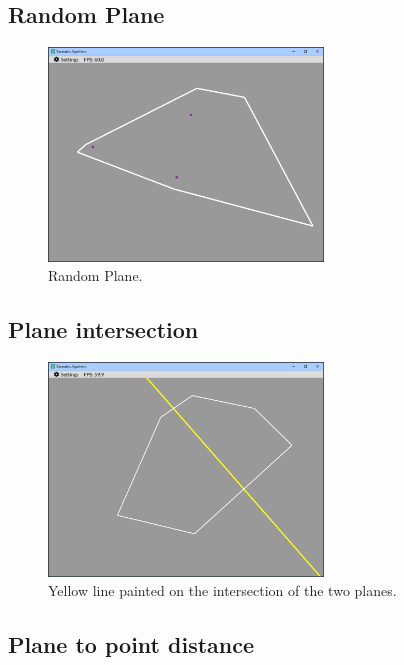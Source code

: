 \documentclass[12pt,a4paper,english]{article}
\begin{document}
\subsection{Random Plane}

\begin{figure}[H]
    \centering
    \includegraphics[width=0.65\textwidth]{p2b-1}
    \caption[]{Random Plane.}
    \label{fig:p2b-1}
\end{figure}

\subsection{Plane intersection}

\begin{figure}[H]
    \centering
    \includegraphics[width=0.65\textwidth]{p2b-2}
    \caption[]{Yellow line painted on the intersection of the two planes.}
    \label{fig:p2b-2}
\end{figure}

\subsection{Plane to point distance}
\end{document}
